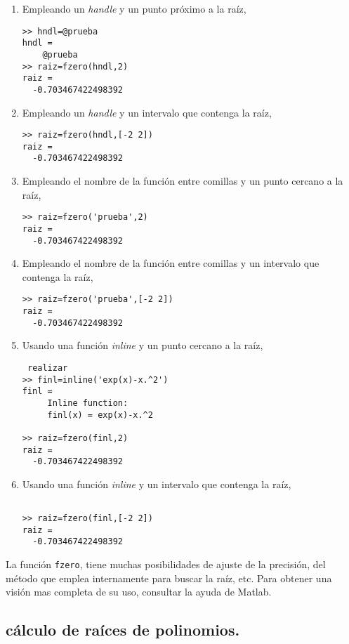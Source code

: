 \begin{enumerate}
\item Empleando un \emph{handle} y un punto próximo a la raíz,
\begin{verbatim}
>> hndl=@prueba
hndl = 
    @prueba
>> raiz=fzero(hndl,2)
raiz =
  -0.703467422498392
\end{verbatim}
\item Empleando un \emph{handle} y un intervalo que contenga la raíz,
\begin{verbatim}
>> raiz=fzero(hndl,[-2 2])
raiz =
  -0.703467422498392
\end{verbatim}

\item Empleando el nombre de la función entre comillas y un punto cercano a la raíz,
\begin{verbatim}
>> raiz=fzero('prueba',2)
raiz =
  -0.703467422498392
\end{verbatim}

\item  Empleando el nombre de la función entre comillas y un intervalo que contenga la raíz,
\begin{verbatim}
>> raiz=fzero('prueba',[-2 2])
raiz =
  -0.703467422498392
\end{verbatim}

\item Usando una función \emph{inline} y un punto cercano a la raíz,
\begin{verbatim} realizar 
>> finl=inline('exp(x)-x.^2')
finl =
     Inline function:
     finl(x) = exp(x)-x.^2

>> raiz=fzero(finl,2)
raiz =
  -0.703467422498392
\end{verbatim}

\item Usando una función \emph{inline} y un intervalo que contenga la raíz, 
\begin{verbatim}

>> raiz=fzero(finl,[-2 2])
raiz =
  -0.703467422498392
\end{verbatim}
\end{enumerate} 

La función \texttt{fzero}, tiene muchas posibilidades de ajuste de la precisión, del método que emplea internamente para buscar la raíz, etc. Para obtener una visión mas completa de su uso, consultar la ayuda de Matlab.

\subsection{cálculo de raíces de polinomios.} 

